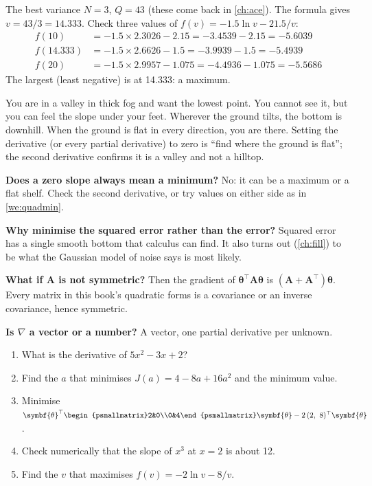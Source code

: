\documentclass[11pt,a4paper,oneside,openany]{book}
\newcommand{\B}[1]{{\symbf{#1}}}
\newcommand{\B}[1]{{\bm{#1}}}
\newcommand{\T}{^{\top}}
\newcommand{\vtheta}{\B{\theta}}
\newcommand{\mA}{\B{A}}
\begin{document}
\begin{worked}[label=we:varmax]{The best variance}
$N=3$, $Q=43$ (these come back in \cref{ch:ace}). The formula gives $v=43/3=14.333$. Check three values of
$f(v)=-1.5\ln v-21.5/v$:
\begin{align*}
f(10) &= -1.5\times2.3026-2.15=-3.4539-2.15=-5.6039\\
f(14.333) &= -1.5\times2.6626-1.5=-3.9939-1.5=-5.4939\\
f(20) &= -1.5\times2.9957-1.075=-4.4936-1.075=-5.5686
\end{align*}
The largest (least negative) is at 14.333: a maximum.
\end{worked}

\begin{analogy}
You are in a valley in thick fog and want the lowest point. You cannot see it, but you can feel the slope under your feet.
Wherever the ground tilts, the bottom is downhill. When the ground is flat in every direction, you are there. Setting the
derivative (or every partial derivative) to zero is ``find where the ground is flat''; the second derivative confirms it is
a valley and not a hilltop.
\end{analogy}

\begin{confusions}
\textbf{Does a zero slope always mean a minimum?} No: it can be a maximum or a flat shelf. Check the second derivative, or try
values on either side as in \cref{we:quadmin}.

\textbf{Why minimise the squared error rather than the error?} Squared error has a single smooth bottom that calculus can
find. It also turns out (\cref{ch:fill}) to be what the Gaussian model of noise says is most likely.

\textbf{What if $\mA$ is not symmetric?} Then the gradient of $\vtheta\T\mA\vtheta$ is $(\mA+\mA\T)\vtheta$. Every matrix in
this book's quadratic forms is a covariance or an inverse covariance, hence symmetric.

\textbf{Is $\nabla$ a vector or a number?} A vector, one partial derivative per unknown.
\end{confusions}

\begin{checkyourself}
\begin{enumerate}
\item What is the derivative of $5x^2-3x+2$?
\item Find the $a$ that minimises $J(a)=4-8a+16a^2$ and the minimum value.
\item Minimise $\vtheta\T\begin{psmallmatrix}2&0\\0&4\end{psmallmatrix}\vtheta-2\,(2,\ 8)\T\vtheta$.
\item Check numerically that the slope of $x^3$ at $x=2$ is about 12.
\item Find the $v$ that maximises $f(v)=-2\ln v-8/v$.
\end{enumerate}
\end{checkyourself}
\end{document}
